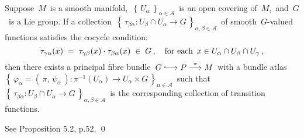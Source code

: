 
\vskip 0.5cm
\begin{proposition}
\mbox{}
\vskip 0.2cm
\noindent
Suppose \,$M$\, is a smooth manifold,
\,$\left\{\,U_{\alpha}\,\right\}_{\alpha\in\mathcal{A}}$\,
is an open covering of \,$M$,\, and
\,$G$\, is a Lie group.
If a collection
\,$\left\{\,\tau_{\beta\alpha} : U_{\beta} \cap U_{\alpha} \longrightarrow G\,\right\}_{\alpha,\beta\in\mathcal{A}}$\,
of smooth \,$G$-valued functions
satisfies the cocycle condition:
\begin{equation*}
\tau_{\gamma\alpha}(x) \; = \; \tau_{\gamma\beta}(x) \cdot \tau_{\beta\alpha}(x) \; \in \; G\,,
\quad
\textnormal{for each \,$x \in U_{\alpha} \cap U_{\beta} \cap U_{\gamma}$}\,,
\end{equation*}
then there exists a principal fibre bundle
\,$G \longhookrightarrow P \overset{\pi}{\longrightarrow} M$\,
with a bundle atlas
\,$\left\{\,\varphi_{\alpha} = (\,\pi,\,\psi_{\alpha}\,) : \pi^{-1}(U_{\alpha}) \longrightarrow U_{\alpha} \times G\,\right\}_{\alpha\in\mathcal{A}}$\,
such that
\,$\left\{\,\tau_{\beta\alpha} : U_{\beta} \cap U_{\alpha} \longrightarrow G\,\right\}_{\alpha,\beta\in\mathcal{A}}$\,
is the corresponding collection of transition functions.
\end{proposition}
\proof
See Proposition 5.2, p.52, \cite{Kobayashi1963v1}
\qed


